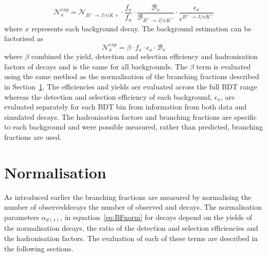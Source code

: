 {{\begin{equation}
\mathcal{N}^{exp}_{x} = \mathcal{N}_{B^{+} \to J/\psi K{+}} \cdot \frac{f_{x}}{f_{u}} \cdot \frac{\mathcal{B}_{x}}{\mathcal{B}_{B^{+} \to J/\psi K^{+}}} \cdot \frac{\epsilon_{x}}{\epsilon^{B^{+} \to J/\psi K^{+}}} 
\label{eq:BkgndPredict}
\end{equation}
where $x$ represents each background decay. The background estimation can be factorised as
\begin{equation}
\mathcal{N}^{exp}_{x} = \beta \cdot f_{x} \cdot \epsilon_{x} \cdot \mathcal{B}_{x}
\label{eq:BkgndPredict2}
\end{equation}
where $\beta$ combined the yield, detection and selection efficiency and hadronisation factors of \bujpsik decays and is the same for all backgrounds. The $\beta$ term is evaluated using the same method as the normalisation of the \bmumu branching fractions described in Section~\ref{sec:Normalisation}. The \bujpisk efficiencies and yields aer evaluated across the full BDT range whereas the detection and selection efficiency of each background, $ \epsilon_{x}$, are evaluated separately for each BDT bin from information from both data and simulated decays. The hadronisation factors and branching fractions are specific to each background and were possible measured, rather than predicted, branching fractions are used. %

\section{Normalisation}
\label{sec:Normalisation}

As introduced earlier the \bmumu branching fractions are measured by normalising the number of observed\bmumu decays the number of observed \bujpsik and \bdkpi decays. 
The normalisation parameters $\alpha_{d(s)}$, in equation~\ref{eq:BFnorm} for \bmumu decays depend on the yields of the normalisation decays, the ratio of the detection and selection efficiencies and the hadronisation factors. The evaluation of each of these terms are described in the following sections.



}}
